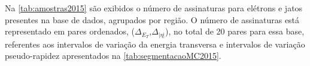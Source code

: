 
Na \autoref{tab:amostras2015} são exibidos o número de assinaturas para elétrons e jatos presentes na base de dados, agrupados por região. O número de assinaturas está representado em pares ordenados, ($\Delta_{E_T}$,$\Delta_{|\eta|}$), no total de 20 pares para essa base, referentes aos intervalos de variação da energia transversa e intervalos de variação pseudo-rapidez apresentados na \autoref{tab:segmentacaoMC2015}.


